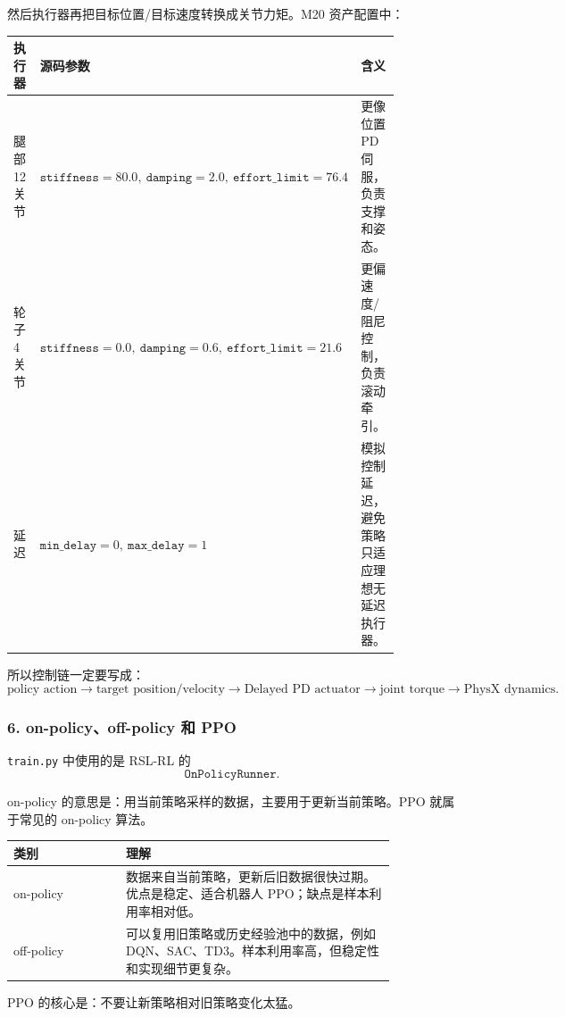\documentclass[UTF8,11pt,a4paper]{ctexart}
\begin{document}
然后执行器再把目标位置/目标速度转换成关节力矩。M20 资产配置中：

\begin{center}
\renewcommand{\arraystretch}{1.25}
\begin{tabular}{p{0.24\linewidth}p{0.28\linewidth}p{0.34\linewidth}}
\toprule
\textbf{执行器} & \textbf{源码参数} & \textbf{含义}\\
\midrule
腿部 12 关节 &
\(\texttt{stiffness}=80.0,\ \texttt{damping}=2.0,\ \texttt{effort\_limit}=76.4\) &
更像位置 PD 伺服，负责支撑和姿态。\\
轮子 4 关节 &
\(\texttt{stiffness}=0.0,\ \texttt{damping}=0.6,\ \texttt{effort\_limit}=21.6\) &
更偏速度/阻尼控制，负责滚动牵引。\\
延迟 &
\(\texttt{min\_delay}=0,\ \texttt{max\_delay}=1\) &
模拟控制延迟，避免策略只适应理想无延迟执行器。\\
\bottomrule
\end{tabular}
\end{center}

所以控制链一定要写成：
\[
\boxed{
\text{policy action}
\rightarrow
\text{target position/velocity}
\rightarrow
\text{Delayed PD actuator}
\rightarrow
\text{joint torque}
\rightarrow
\text{PhysX dynamics}.
}
\]

\subsubsection{6. on-policy、off-policy 和 PPO}

\texttt{train.py} 中使用的是 RSL-RL 的
\[
\texttt{OnPolicyRunner}.
\]

on-policy 的意思是：用当前策略采样的数据，主要用于更新当前策略。PPO 就属于常见的 on-policy 算法。

\begin{center}
\renewcommand{\arraystretch}{1.25}
\begin{tabular}{p{0.25\linewidth}p{0.60\linewidth}}
\toprule
\textbf{类别} & \textbf{理解}\\
\midrule
on-policy & 数据来自当前策略，更新后旧数据很快过期。优点是稳定、适合机器人 PPO；缺点是样本利用率相对低。\\
off-policy & 可以复用旧策略或历史经验池中的数据，例如 DQN、SAC、TD3。样本利用率高，但稳定性和实现细节更复杂。\\
\bottomrule
\end{tabular}
\end{center}

PPO 的核心是：不要让新策略相对旧策略变化太猛。
\end{document}
